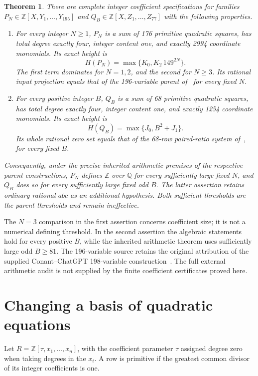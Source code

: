 \documentclass[11pt,a4paper]{article}
\newtheorem{theorem}{Theorem}[section]
\newcommand{\Q}{\mathbb Q}\newcommand{\Z}{\mathbb Z}
\begin{document}
\begin{theorem}\label{thm:families}
There are complete integer coefficient specifications for families
$P_N\in\Z[X,Y_1,\ldots,Y_{195}]$ and
$Q_B\in\Z[X,Z_1,\ldots,Z_{77}]$ with the following properties.
\begin{enumerate}
\item For every integer $N\ge1$, $P_N$ is a sum of 176 primitive
quadratic squares, has total degree exactly four, integer content one,
and exactly 2994 coordinate monomials. Its exact height is
\[
                    H(P_N)=\max\{K_0,K_2\,149^{2N}\}.
\]
The first term dominates for $N=1,2$, and the second for $N\ge3$.
Its rational input projection equals that of the 196-variable parent
of~\cite{Parent196} for every fixed $N$.
\item For every positive integer $B$, $Q_B$ is a sum of 68 primitive
quadratic squares, has total degree exactly four, integer content one,
and exactly 1254 coordinate monomials. Its exact height is
\[
                         H(Q_B)=\max\{J_0,B^2+J_1\}.
\]
Its whole rational zero set equals that of the 68-row paired-ratio
system of~\cite{Paired}, for every fixed $B$.
\end{enumerate}
Consequently, under the precise inherited arithmetic premises of the
respective parent constructions, $P_N$ defines $\Z$ over $\Q$ for every
sufficiently large fixed $N$, and $Q_B$ does so for every sufficiently
large fixed odd $B$. The latter assertion retains ordinary rational
$abc$ as an additional hypothesis. Both sufficient thresholds are the
parent thresholds and remain ineffective.
\end{theorem}

The $N=3$ comparison in the first assertion concerns coefficient size;
it is not a numerical defining threshold. In the second assertion the
algebraic statements hold for every positive $B$, while the inherited
arithmetic theorem uses sufficiently large odd $B\ge81$.
The 196-variable source retains the original attribution of the supplied
Conant--ChatGPT 198-variable construction~\cite{Archive}.
The full external arithmetic audit is not supplied by the finite
coefficient certificates proved here.

\section{Changing a basis of quadratic equations}
Let $R=\Z[\tau,x_1,\ldots,x_n]$, with the coefficient parameter $\tau$
assigned degree zero when taking degrees in the $x_i$. A row is primitive
if the greatest common divisor of its integer coefficients is one.
\end{document}
